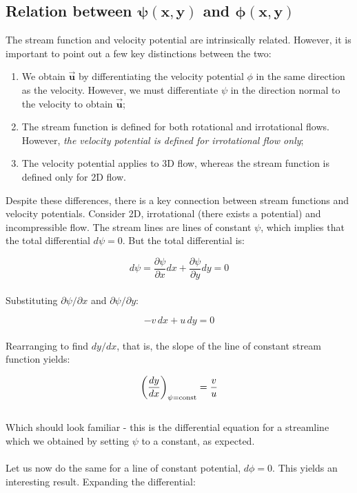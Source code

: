 \documentclass[11pt]{article}
\begin{document}
\subsection{Relation between $\bm{\psi(x,y)}$ and $\bm{\phi(x,y)}$}
The stream function and velocity potential are intrinsically related. However, it is important to point out a few key distinctions between the two:

\begin{enumerate}
    \item We obtain $\vec{\bm{u}}$ by differentiating the velocity potential $\phi$ in the same direction as the velocity. However, we must differentiate $\psi$ in the direction normal to the velocity to obtain $\vec{\bm{u}}$;
    \item The stream function is defined for both rotational and irrotational flows. However, \emph{the velocity potential is defined for irrotational flow only};
    \item The velocity potential applies to 3D flow, whereas the stream function is defined only for 2D flow.
\end{enumerate}
\noindent
Despite these differences, there is a key connection between stream functions and velocity potentials. Consider 2D, irrotational (there exists a potential) and incompressible flow. The stream lines are lines of constant $\psi$, which implies that the total differential $d\psi = 0$. But the total differential is:

\begin{equation*}
    d\psi = \frac{\partial \psi}{\partial x}dx + \frac{\partial \psi}{\partial y}dy = 0
\end{equation*}\\
\noindent
Substituting $\partial \psi / \partial x$ and $\partial \psi / \partial y$:

\begin{equation*}
    -v\,dx + u\,dy = 0
\end{equation*}\\
\noindent
Rearranging to find $dy/dx$, that is, the slope of the line of constant stream function yields:

\begin{equation*}
    \left( \frac{dy}{dx} \right)_{\psi = \textnormal{const}} = \frac{v}{u}
\end{equation*}\\
\noindent
Which should look familiar - this is the differential equation for a streamline which we obtained by setting $\psi$ to a constant, as expected.\\ \\
\noindent
Let us now do the same for a line of constant potential, $d\phi = 0$. This yields an interesting result. Expanding the differential:
\end{document}
